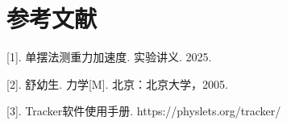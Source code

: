 \documentclass[12pt,a4paper]{article}
\begin{document}
    \section{参考文献}
        [1]. 单摆法测重力加速度. 实验讲义. 2025.

        [2]. 舒幼生. 力学[M]. 北京：北京大学，2005.

        [3]. Tracker软件使用手册. https://physlets.org/tracker/
\end{document}
